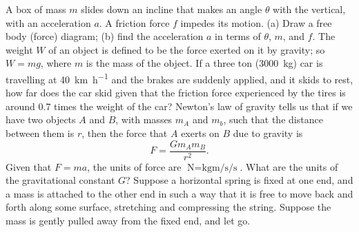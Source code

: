 \documentclass[a4paper]{exam}
\begin{document}
\begin{questions}
    \question A box of mass $ m $ slides down an incline that makes an angle $ \theta $ with the vertical, with an acceleration $ a $.
              A friction force $ f $ impedes its motion. (a) Draw a free body (force) diagram; (b) find the acceleration $ a $
              in terms of $ \theta $, $ m $, and $ f $.
    \question The weight $ W $ of an object is defined to be the force exerted on it by gravity; so $ W = mg $, where $ m $ is the
              mass of the object. If a three ton (\SI{3000}{\kilo\gram}) car is travelling at \SI{40}{\kilo\metre\per\hour}
              and the brakes are suddenly applied, and it skids to rest, how far does the car skid given that the friction
              force experienced by the tires is around 0.7 times the weight of the car?
    \question Newton's law of gravity tells us that if we have two objects $ A $ and $ B $, with masses $ m_A $ and $ m_b $,
              such that the distance between them is $ r $, then the force that $ A $ exerts on $ B $ due to gravity is
              \begin{displaymath}
                F = \frac{Gm_A m_B}{r^2}.
              \end{displaymath}
              Given that $ F = ma $, the units of force are $ \si{\newton} = \si{\kilo\gram\metre\per\second\per\second} $. What
              are the units of the gravitational constant $ G $?
    \question Suppose a horizontal spring is fixed at one end, and a mass is attached to the other end in such a way that it is free
              to move back and forth along some surface, stretching and compressing the string. Suppose the mass is gently pulled
              away from the fixed end, and let go.
      \begin{parts}

\end{parts}
\end{questions}
\end{document}
